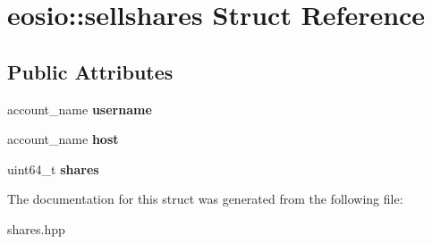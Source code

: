 \hypertarget{structeosio_1_1sellshares}{}\section{eosio\+:\+:sellshares Struct Reference}
\label{structeosio_1_1sellshares}
\subsection*{Public Attributes}
\begin{DoxyCompactItemize}
\item 
\mbox{\label{structeosio_1_1sellshares_aeb63557e9d5e16e4b5a0fc3409eb202a}} 
account\+\_\+name {\bfseries username}
\item 
\mbox{\label{structeosio_1_1sellshares_aab48a2a356dd7567dc2f14ad901e2ab8}} 
account\+\_\+name {\bfseries host}
\item 
\mbox{\label{structeosio_1_1sellshares_ae058444cdeff1fcea026f9dddd597e37}} 
uint64\+\_\+t {\bfseries shares}
\end{DoxyCompactItemize}


The documentation for this struct was generated from the following file\+:\begin{DoxyCompactItemize}
\item 
shares.\+hpp\end{DoxyCompactItemize}
